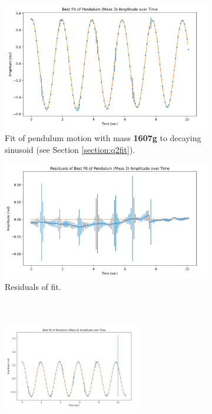 \documentclass[12pt]{article}
\begin{document}
\begin{figure}[h]
    \centering
    \begin{subfigure}[b]{0.48\textwidth}
        \centering
        \includegraphics[width=\textwidth]{q4b_fit3.png}
        \caption{Fit of pendulum motion with mass \textbf{1607g} to decaying sinusoid (see Section \ref{section:q2fit}).}
    \end{subfigure}
    \hfill
    \begin{subfigure}[b]{0.48\textwidth}
        \centering
        \includegraphics[width=\textwidth]{q4b_residuals3.png}
        \caption{Residuals of fit.}
    \end{subfigure}
    \begin{subfigure}[b]{0.48\textwidth}
        \centering
        \includegraphics[width=6cm,height=6cm, keepaspectratio]{q4b_fit4.png}

\end{subfigure}
\end{figure}
\end{document}
